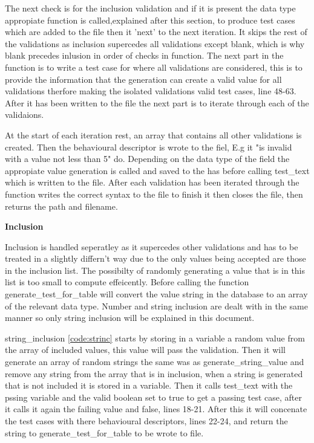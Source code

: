 \documentclass[a4paper,12pt]{article}
\begin{document}
\par The next check is for the inclusion validation and if it is present the data type appropiate function is called,explained after this section, to produce test cases which are added to the file then it 'next' to the next iteration. It skips the rest of the validations as inclusion supercedes all validations except blank, which is why blank precedes inlusion in order of checks in function. The next part in the function is to write a test case for where all validations are considered, this is to provide the information that the generation can create a valid value for all validations therfore making the isolated validations valid test cases, line 48-63. After it has been written to the file the next part is to iterate through each of the validaions. 
\par At the start of each iteration rest, an array that contains all other validations is created. Then the behavioural descriptor is wrote to the fiel, E.g it "is invalid with a value not less than 5" do. Depending on the data type of the field the appropiate value generation is called and saved to the has before calling test\_text which is written to the file. After each validation has been iterated through the function writes the correct syntax to the file to finish it then closes the file, then returns the path and filename.

\par \textbf{Inclusion}
\par Inclusion is handled seperatley as it supercedes other validations and has to be treated in a slightly differn't way due to the only values being accepted are those in the inclusion list. The possibilty of randomly generating a value that is in this list is too small to compute effeicently. Before calling the function generate\_test\_for\_table will convert the value string in the database to an array of the relevant data type. Number and string inclusion are dealt with in the same manner so only string inclusion will be explained in this document. 
\par string\_inclusion \ref{code:strinc} starts by storing in a variable a random value from the array of included values, this value will pass the validation. Then it will generate an array of random strings the same was as generate\_string\_value and remove any string from the array that is in inclusion, when a string is generated that is not included it is stored in a variable. Then it calls test\_text with the pssing variable and the valid boolean set to true to get a passing test case, after it calls it again the failing value and false, lines 18-21. After this it will concenate the test cases with there behavioural descriptors, lines 22-24, and return the string to generate\_test\_for\_table to be wrote to file.
\end{document}
